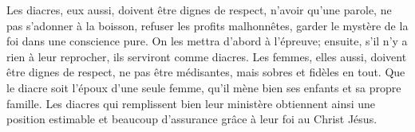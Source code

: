 Les diacres, eux aussi, doivent être dignes de respect, n’avoir qu’une parole,
	ne pas s’adonner à la boisson, refuser les profits malhonnêtes,
	garder le mystère de la foi dans une conscience pure.
On les mettra d’abord à l’épreuve;
	ensuite, s’il n’y a rien à leur reprocher, ils serviront comme diacres.
Les femmes, elles aussi, doivent être dignes de respect,
	ne pas être médisantes, mais sobres et fidèles en tout.
Que le diacre soit l’époux d’une seule femme,
	qu’il mène bien ses enfants et sa propre famille.
Les diacres qui remplissent bien leur ministère
	obtiennent ainsi une position estimable et beaucoup d’assurance
		grâce à leur foi au Christ Jésus.
